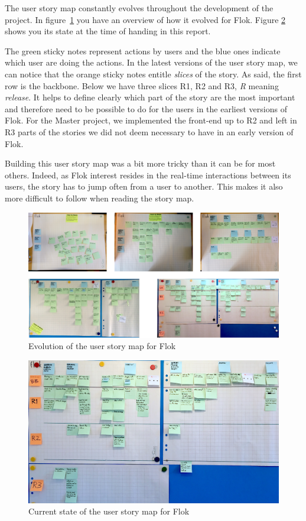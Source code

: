 \documentclass[a4paper,12pt,twoside]{article}
\begin{document}
The user story map constantly evolves throughout the development of the project.
In figure~\ref{fig.flokUsmEvolution} you have an overview of how it evolved for Flok.
Figure \ref{fig.flokUsmCurrent} shows you its state at the time of handing in this report.

The green sticky notes represent actions by users and the blue ones indicate which user are doing the actions.
In the latest versions of the user story map, we can notice that the orange sticky notes entitle \emph{slices} of the story.
As said, the first row is the backbone.
Below we have three slices R1, R2 and R3, \emph{R} meaning \emph{release}.
It helps to define clearly which part of the story are the most important and therefore need to be possible to do for the users in the earliest versions of Flok.
For the Master project, we implemented the front-end up to R2 and left in R3 parts of the stories we did not deem necessary to have in an early version of Flok.

Building this user story map was a bit more tricky than it can be for most others.
Indeed, as Flok interest resides in the real-time interactions between its users, the story has to jump often from a user to another.
This makes it also more difficult to follow when reading the story map.

\begin{figure}[!htb]
    \centering
    \includegraphics[width=\textwidth]{images/flokUsmEvolution.png}
    \caption{Evolution of the user story map for Flok}
    \label{fig.flokUsmEvolution}
\end{figure}

\begin{figure}[!htb]
    \centering
    \includegraphics[width=\textwidth]{images/flokUsmCurrent.jpg}
    \caption{Current state of the user story map for Flok}
    \label{fig.flokUsmCurrent}
\end{figure}
\end{document}
